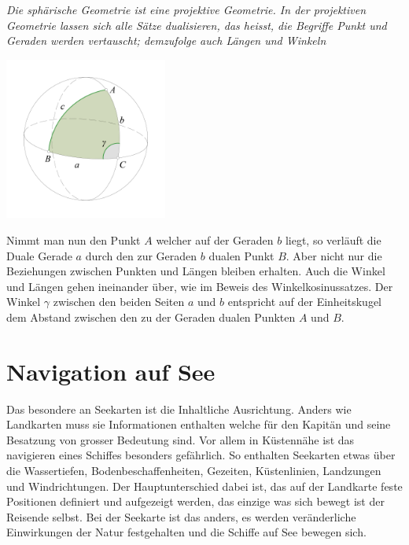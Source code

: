 \begin{refsection}
\begin{satz}\textit{Die sphärische Geometrie ist eine projektive Geometrie. In der projektiven Geometrie lassen sich alle Sätze dualisieren, das heisst, die Begriffe Punkt und Geraden werden vertauscht; demzufolge auch Längen und Winkeln}
\label{skript:kugel:satz:Dualitaet}
\end{satz}

\begin{center}
        \includegraphics[width=0.4\textwidth]{kugel/Dualitaet.jpg}
\end{center}

Nimmt man nun den Punkt $A$ welcher auf der Geraden $b$ liegt, so verläuft die Duale Gerade $a$ durch den zur Geraden $b$ dualen Punkt $B$. 
Aber nicht nur die Beziehungen zwischen Punkten und Längen bleiben erhalten. Auch die Winkel und Längen gehen ineinander über, wie im Beweis des Winkelkosinussatzes.
Der Winkel $\gamma$ zwischen den beiden Seiten $a$ und $b$ entspricht auf der Einheitskugel dem Abstand zwischen den zu der Geraden dualen Punkten $A$ und $B$.



\section{Navigation auf See}
Das besondere an Seekarten ist die Inhaltliche Ausrichtung. Anders wie Landkarten muss sie Informationen enthalten welche für den Kapitän und seine Besatzung von grosser Bedeutung sind. Vor allem in Küstennähe ist das navigieren eines Schiffes besonders gefährlich. So enthalten Seekarten etwas über die Wassertiefen, Bodenbeschaffenheiten, Gezeiten, Küstenlinien, Landzungen und Windrichtungen.
Der Hauptunterschied dabei ist, das auf der Landkarte feste Positionen definiert und aufgezeigt werden, das einzige was sich bewegt ist der Reisende selbst. Bei der Seekarte ist das anders, es werden veränderliche Einwirkungen der Natur festgehalten und die Schiffe auf See bewegen sich.


\end{refsection}
